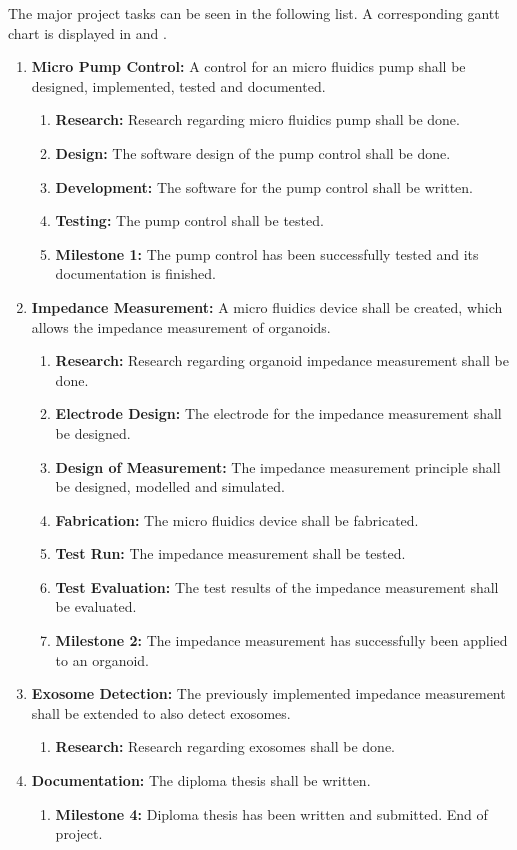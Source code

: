 \documentclass{article}
\begin{document}
The major project tasks can be seen in the following list. A corresponding gantt chart is displayed in  and . 
\begin{enumerate}
\item \textbf{Micro Pump Control:} A control for an micro fluidics pump shall be designed, implemented, tested and documented.
    \begin{enumerate}
        \item \textbf{Research:} Research regarding micro fluidics pump shall be done. 
        \item \textbf{Design:} The software design of the pump control shall be done.
        \item \textbf{Development:} The software for the pump control shall be written.
        \item \textbf{Testing:} The pump control shall be tested.
        \item \textbf{Milestone 1:} The pump control has been successfully tested and its documentation is finished.
    \end{enumerate}
\item \textbf{Impedance Measurement:} A micro fluidics device shall be created, which allows the impedance measurement of organoids.
    \begin{enumerate}
        \item \textbf{Research:} Research regarding organoid impedance measurement shall be done. 
        \item \textbf{Electrode Design:} The electrode for the impedance measurement shall be designed.
        \item \textbf{Design of Measurement:} The impedance measurement principle shall be designed, modelled and simulated.
        \item \textbf{Fabrication:} The micro fluidics device shall be fabricated.
        \item \textbf{Test Run:} The impedance measurement shall be tested.
        \item \textbf{Test Evaluation:} The test results of the impedance measurement shall be evaluated.
        \item \textbf{Milestone 2:} The impedance measurement has successfully been applied to an organoid.
    \end{enumerate}
\item \textbf{Exosome Detection:} The previously implemented impedance measurement shall be extended to also detect exosomes.
    \begin{enumerate}
        \item \textbf{Research:} Research regarding exosomes shall be done.
    \end{enumerate}
\item \textbf{Documentation:} The diploma thesis shall be written.
    \begin{enumerate}
        \item \textbf{Milestone 4:} Diploma thesis has been written and submitted. End of project.
    \end{enumerate}
\end{enumerate}
 
\end{document}
